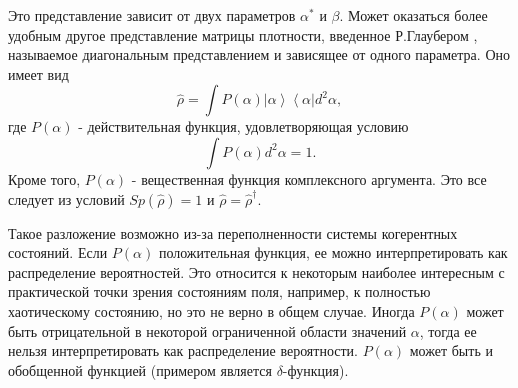 Это представление зависит от двух параметров $\alpha^{*}$ и $\beta$.
Может оказаться более удобным другое представление матрицы плотности,
введенное Р.Глаубером \cite{bQuantumOpticsAndRadioPhisicsLecture1966},
называемое 
диагональным представлением и зависящее от одного параметра. Оно имеет
вид  
\begin{equation}
\hat{\rho} = \int
P\left(\alpha\right)\left|\alpha\right>\left<\alpha\right| d^2 \alpha,
\label{eqCh1_rhorepresent}
\end{equation}
где  $P\left(\alpha\right)$ -  действительная функция,
удовлетворяющая условию 
\[
\int
P\left(\alpha\right) d^2 \alpha = 1.
\]
Кроме того, $P\left(\alpha\right)$ - вещественная функция комплексного
аргумента. Это все следует из условий  $Sp\left(\hat{\rho}\right) = 1$
и  $\hat{\rho} = \hat{\rho}^{\dag}$.
  
Такое разложение возможно из-за переполненности системы когерентных
состояний. Если   $P\left(\alpha\right)$  положительная функция, ее
можно интерпретировать 
как распределение вероятностей. Это относится к некоторым наиболее
интересным с практической точки зрения состояниям поля, например, к
полностью хаотическому состоянию, но это не верно в общем
случае. Иногда   $P\left(\alpha\right)$  может быть отрицательной в
некоторой ограниченной области значений $\alpha$,  тогда ее нельзя интерпретировать как
распределение вероятности.   $P\left(\alpha\right)$  может быть и обобщенной функцией
(примером является $\delta$-функция). 

